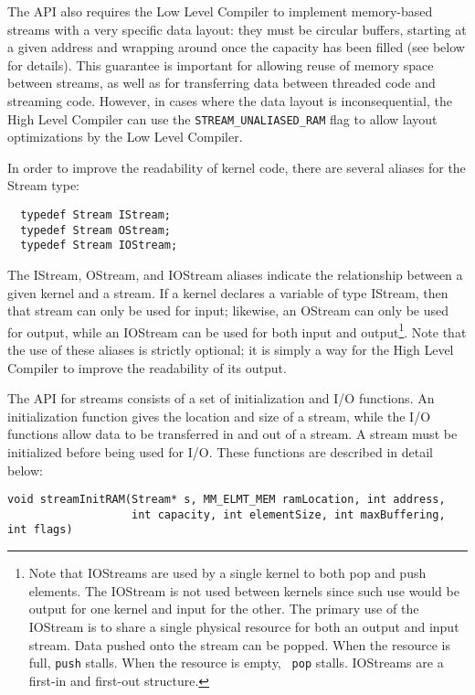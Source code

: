 The API also requires the Low Level Compiler to implement memory-based
streams with a very specific data layout: they must be circular
buffers, starting at a given address and wrapping around once the
capacity has been filled (see below for details).  This guarantee is
important for allowing reuse of memory space between streams, as well
as for transferring data between threaded code and streaming code.
However, in cases where the data layout is inconsequential, the High
Level Compiler can use the {\tt STREAM\_UNALIASED\_RAM} flag to allow
layout optimizations by the Low Level Compiler.

In order to improve the readability of kernel code, there are several
aliases for the Stream type:
{\small
\begin{verbatim}
  typedef Stream IStream;
  typedef Stream OStream;
  typedef Stream IOStream;
\end{verbatim}}
\noindent The IStream, OStream, and IOStream aliases indicate the
relationship between a given kernel and a stream.  If a kernel
declares a variable of type IStream, then that stream can only be used
for input; likewise, an OStream can only be used for output, while an
IOStream can be used for both input and output\footnote{Note that
IOStreams are used by a single kernel to both pop and push elements.
The IOStream is not used between kernels since such use would be
output for one kernel and input for the other. The primary use of the
IOStream is to share a single physical resource for both an output and
input stream.  Data pushed onto the stream can be popped.  When the
resource is full, {\tt push} stalls.  When the resource is empty, {\tt
pop} stalls.  IOStreams are a first-in and first-out structure.}.
Note that the use of these aliases is strictly optional; it is simply
a way for the High Level Compiler to improve the readability of its
output.

The API for streams consists of a set of initialization and I/O
functions.  An initialization function gives the location and size of
a stream, while the I/O functions allow data to be transferred in and
out of a stream.  A stream must be initialized before being used for
I/O.  These functions are described in detail below:
\clearpage
~ \\ \vspace{-24pt} 
\makeline
{}
{\small
\begin{verbatim}
void streamInitRAM(Stream* s, MM_ELMT_MEM ramLocation, int address, 
                   int capacity, int elementSize, int maxBuffering, int flags)
\end{verbatim}}

